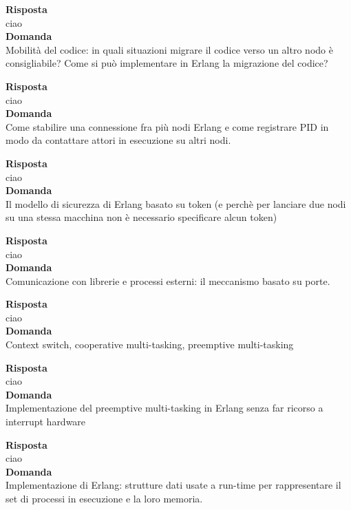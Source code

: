 \documentclass{article}
\begin{document}
\textbf{Risposta}\\
ciao
\vspace{14pt}\\
\textbf{Domanda}\\
Mobilità del codice: in quali situazioni migrare il codice verso un altro nodo è consigliabile? Come si può implementare in Erlang la migrazione del codice?

\textbf{Risposta}\\
ciao
\vspace{14pt}\\
\textbf{Domanda}\\
Come stabilire una connessione fra più nodi Erlang e come registrare PID in modo da contattare attori in esecuzione su altri nodi.

\textbf{Risposta}\\
ciao
\vspace{14pt}\\
\textbf{Domanda}\\
Il modello di sicurezza di Erlang basato su token (e perchè per lanciare due nodi su una stessa macchina non è necessario specificare alcun token)

\textbf{Risposta}\\
ciao
\vspace{14pt}\\
\textbf{Domanda}\\
Comunicazione con librerie e processi esterni: il meccanismo basato su porte.

\textbf{Risposta}\\
ciao
\vspace{14pt}\\
\textbf{Domanda}\\
Context switch, cooperative multi-tasking, preemptive multi-tasking

\textbf{Risposta}\\
ciao
\vspace{14pt}\\
\textbf{Domanda}\\
Implementazione del preemptive multi-tasking in Erlang senza far ricorso a interrupt hardware

\textbf{Risposta}\\
ciao
\vspace{14pt}\\
\textbf{Domanda}\\
Implementazione di Erlang: strutture dati usate a run-time per rappresentare il set di processi in esecuzione e la loro memoria.
\end{document}
